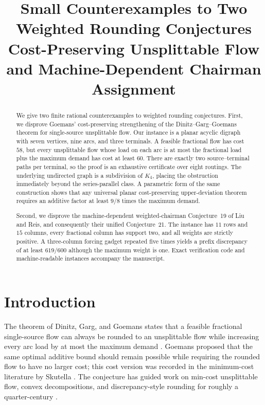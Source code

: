 \documentclass[11pt]{article}
\title{Small Counterexamples to Two Weighted Rounding Conjectures\\
\large Cost-Preserving Unsplittable Flow and Machine-Dependent Chairman Assignment}
\date{}
\theoremstyle{definition}
\begin{document}
\maketitle

\begin{abstract}
We give two finite rational counterexamples to weighted rounding conjectures.
First, we disprove Goemans' cost-preserving strengthening of the
Dinitz--Garg--Goemans theorem for single-source unsplittable flow.  Our
instance is a planar acyclic digraph with seven vertices, nine arcs, and three
terminals.  A feasible fractional flow has cost $58$, but every unsplittable
flow whose load on each arc is at most the fractional load plus the maximum
demand has cost at least $60$.  There are exactly two source--terminal paths
per terminal, so the proof is an exhaustive certificate over eight routings.
The underlying undirected graph is a subdivision of $K_4$, placing the
obstruction immediately beyond the series-parallel class.  A parametric form
of the same construction shows that any universal planar cost-preserving
upper-deviation theorem requires an additive factor at least $9/8$ times the
maximum demand.

Second, we disprove the machine-dependent weighted-chairman Conjecture~19 of
Liu and Reis, and consequently their unified Conjecture~21.  The instance has
$11$ rows and $15$ columns, every fractional column has support two, and all
weights are strictly positive.  A three-column forcing gadget repeated five
times yields a prefix discrepancy of at least $619/600$ although the maximum
weight is one.  Exact verification code and machine-readable instances
accompany the manuscript.
\end{abstract}

\section{Introduction}

The theorem of Dinitz, Garg, and Goemans states that a feasible fractional
single-source flow can always be rounded to an unsplittable flow while
increasing every arc load by at most the maximum demand
\cite{DinitzGargGoemans1999}.  Goemans proposed that the same optimal additive
bound should remain possible while requiring the rounded flow to have no
larger cost; this cost version was recorded in the minimum-cost literature by
Skutella \cite{Skutella2002}.  The conjecture has guided work on min-cost
unsplittable flow, convex decompositions, and discrepancy-style rounding for
roughly a quarter-century
\cite{MartensSalazarSkutella2007,MorellSkutella2022,SwamyTraubVargasKochZenklusen2026}.
\end{document}
